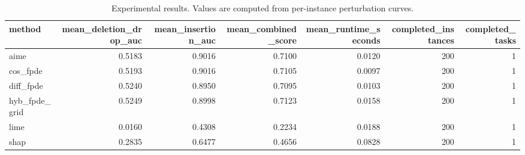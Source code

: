 \begin{table}[t]
\caption{Experimental results. Values are computed from per-instance perturbation curves.}
\label{tab:main_results_computed}
\centering
\begin{tabular}{lrrrrrr}
\toprule
method & mean\_deletion\_drop\_auc & mean\_insertion\_auc & mean\_combined\_score & mean\_runtime\_seconds & completed\_instances & completed\_tasks \\
\midrule
aime & 0.5183 & 0.9016 & 0.7100 & 0.0120 & 200 & 1 \\
cos\_fpde & 0.5193 & 0.9016 & 0.7105 & 0.0097 & 200 & 1 \\
diff\_fpde & 0.5240 & 0.8950 & 0.7095 & 0.0103 & 200 & 1 \\
hyb\_fpde\_grid & 0.5249 & 0.8998 & 0.7123 & 0.0158 & 200 & 1 \\
lime & 0.0160 & 0.4308 & 0.2234 & 0.0188 & 200 & 1 \\
shap & 0.2835 & 0.6477 & 0.4656 & 0.0828 & 200 & 1 \\
\bottomrule
\end{tabular}

\end{table}
